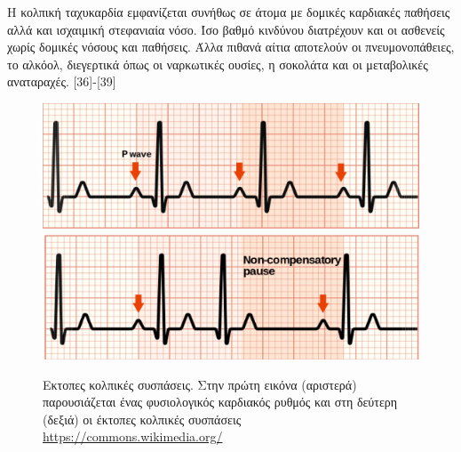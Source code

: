 \begin{itemize}
	Η κολπική ταχυκαρδία εμφανίζεται συνήθως σε άτομα με δομικές καρδιακές παθήσεις αλλά και ισχαιμική στεφανιαία νόσο. Ίσο βαθμό κινδύνου διατρέχουν και οι ασθενείς χωρίς δομικές νόσους και παθήσεις. Άλλα πιθανά αίτια αποτελούν οι πνευμονοπάθειες, το αλκόολ, διεγερτικά όπως οι ναρκωτικές ουσίες, η σοκολάτα και οι μεταβολικές αναταραχές. [36]-[39]  
	\begin{figure}[h]
		\centering
		\includegraphics[scale=0.4]{normal.png}
		\includegraphics[scale=0.4]{pac.png}
		\caption{Εκτοπες κολπικές συσπάσεις. Στην πρώτη εικόνα (αριστερά) παρουσιάζεται ένας φυσιολογικός καρδιακός ρυθμός και στη δεύτερη (δεξιά) οι έκτοπες κολπικές συσπάσεις \en\protect\url{https://commons.wikimedia.org/}}
	\end{figure}

\end{itemize}
